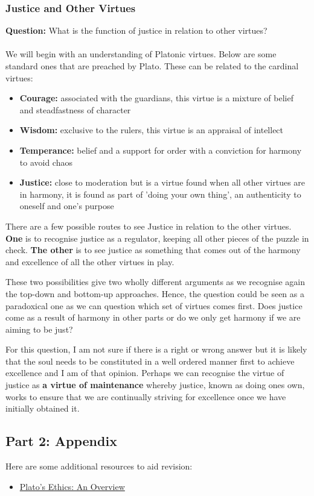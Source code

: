 \documentclass[12pt, letterpaper]{article}
\begin{document}
\subsubsection{Justice and Other Virtues}
\textbf{Question:} What is the function of justice in relation to other virtues?\\\\
We will begin with an understanding of Platonic virtues. Below are some standard ones that are preached by Plato. These can be related to the cardinal virtues:
\begin{itemize}
	\item \textbf{Courage:} associated with the guardians, this virtue is a mixture of belief and steadfastness of character
	\item \textbf{Wisdom:} exclusive to the rulers, this virtue is an appraisal of intellect
	\item \textbf{Temperance:} belief and a support for order with a conviction for harmony to avoid chaos
	\item \textbf{Justice:} close to moderation but is a virtue found when all other virtues are in harmony, it is found as part of 'doing your own thing', an authenticity to oneself and one's purpose
\end{itemize}
There are a few possible routes to see Justice in relation to the other virtues. \textbf{One} is to recognise justice as a regulator, keeping all other pieces of the puzzle in check. \textbf{The other} is to see justice as something that comes out of the harmony and excellence of all the other virtues in play.

These two possibilities give two wholly different arguments as we recognise again the top-down and bottom-up approaches. Hence, the question could be seen as a paradoxical one as we can question which set of virtues comes first. Does justice come as a result of harmony in other parts or do we only get harmony if we are aiming to be just?

For this question, I am not sure if there is a right or wrong answer but it is likely that the soul needs to be constituted in a well ordered manner first to achieve excellence and I am of that opinion. Perhaps we can recognise the virtue of justice as \textbf{a virtue of maintenance} whereby justice, known as doing ones own, works to ensure that we are continually striving for excellence once we have initially obtained it.

\subsection{Part 2: Appendix}
Here are some additional resources to aid revision:
\begin{itemize}
	\item \href{https://plato.stanford.edu/entries/plato-ethics/#MidPerJusOthVir}{Plato's Ethics: An Overview}
\end{itemize}
\end{document}
